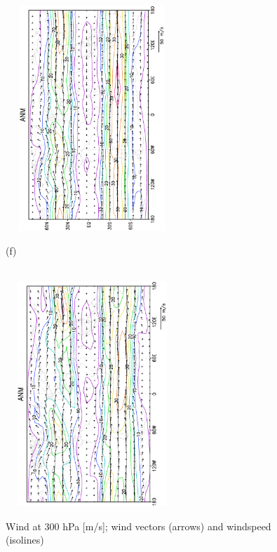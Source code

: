 \documentclass[12pt,a4paper,twoside,openright,headinclude,liststotoc,bibtotoc]{scrreprt}
\begin{document}
\begin{figure}[H]
{\includegraphics[height=8.5cm,width=6.5cm,angle=-90]
{eps/tmuv300.eps}
}
\parbox{8.5cm}{\hspace{0.25cm}\begin{scriptsize}(f)\end{scriptsize} \vspace{-0.7cm} \\
\includegraphics[height=8.5cm,width=6.5cm,angle=-90]
{eps/t21tmuv300.eps}
}
\caption[Wind at 300 hPa]{Wind at 300 hPa [m/s]; wind vectors (arrows) and windspeed (isolines)}
\label{img:u300}
\end{figure}
\end{document}
